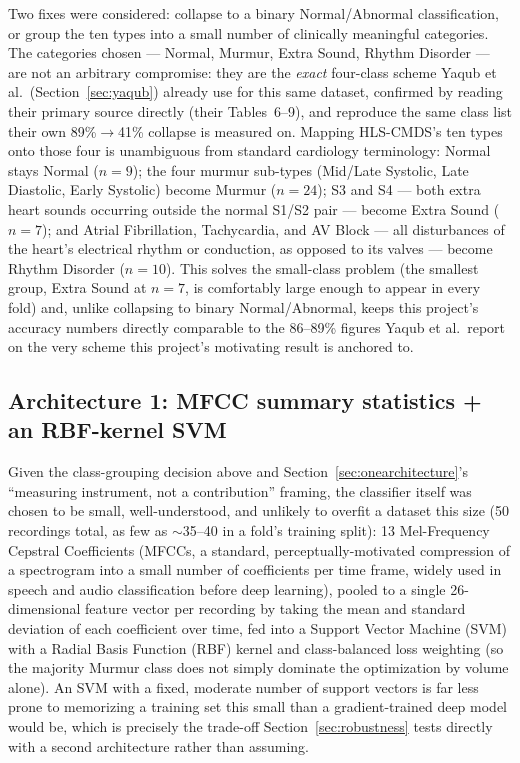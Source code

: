 \documentclass[11pt]{article}
\begin{document}
Two fixes were considered: collapse to a binary Normal/Abnormal
classification, or group the ten types into a small number of clinically
meaningful categories. The categories chosen --- Normal, Murmur, Extra
Sound, Rhythm Disorder --- are not an arbitrary compromise: they are the
\emph{exact} four-class scheme Yaqub et al.\ (Section~\ref{sec:yaqub})
already use for this same dataset, confirmed by reading their primary
source directly (their Tables~6--9), and reproduce the same class list
their own 89\%$\to$41\% collapse is measured on. Mapping HLS-CMDS's ten
types onto those four is unambiguous from standard cardiology terminology:
Normal stays Normal ($n{=}9$); the four murmur sub-types (Mid/Late
Systolic, Late Diastolic, Early Systolic) become Murmur ($n{=}24$); S3 and
S4 --- both extra heart sounds occurring outside the normal S1/S2 pair ---
become Extra Sound ($n{=}7$); and Atrial Fibrillation, Tachycardia, and
AV Block --- all disturbances of the heart's electrical rhythm or
conduction, as opposed to its valves --- become Rhythm Disorder
($n{=}10$). This solves the small-class problem (the smallest group,
Extra Sound at $n{=}7$, is comfortably large enough to appear in every
fold) and, unlike collapsing to binary Normal/Abnormal, keeps this
project's accuracy numbers directly comparable to the 86--89\% figures
Yaqub et al.\ report on the very scheme this project's motivating result
is anchored to.

\subsection{Architecture 1: MFCC summary statistics + an RBF-kernel SVM}
\label{sec:arch1}

Given the class-grouping decision above and Section~\ref{sec:onearchitecture}'s
``measuring instrument, not a contribution'' framing, the classifier itself
was chosen to be small, well-understood, and unlikely to overfit a dataset
this size (50 recordings total, as few as $\sim$35--40 in a fold's training
split): 13 Mel-Frequency Cepstral Coefficients (MFCCs, a standard,
perceptually-motivated compression of a spectrogram into a small number of
coefficients per time frame, widely used in speech and audio
classification before deep learning), pooled to a single 26-dimensional
feature vector per recording by taking the mean and standard deviation of
each coefficient over time, fed into a Support Vector Machine (SVM) with a
Radial Basis Function (RBF) kernel and class-balanced loss weighting (so
the majority Murmur class does not simply dominate the optimization by
volume alone). An SVM with a fixed, moderate number of support vectors is
far less prone to memorizing a training set this small than a
gradient-trained deep model would be, which is precisely the trade-off
Section~\ref{sec:robustness} tests directly with a second architecture
rather than assuming.
\end{document}
